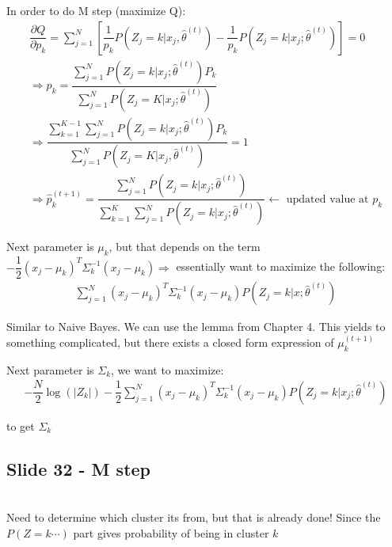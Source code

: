 \noindent In order to do M step (maximize Q):
\begin{equation*}
  \begin{gathered}
    \dfrac{\partial Q}{\partial p_k} = \sum_{j=1}^{N}\left[\dfrac{1}{p_k}P(Z_j=k|x_j,\widehat{\theta}^{(t)})-\dfrac{1}{p_k}P(Z_j=k|x_j;\widehat{\theta}^{(t)})\right] = 0\\
    \Rightarrow p_k = \dfrac{\sum_{j=1}^{N}P(Z_j=k|x_j;\widehat{\theta}^{(t)})P_k}{\sum_{j=1}^{N}P(Z_j=K|x_j;\widehat{\theta}^{(t)})}\\
    \Rightarrow \dfrac{\sum_{k=1}^{K-1}\sum_{j=1}^{N}P(Z_j=k|x_j;\widehat{\theta}^{(t)})P_k}{\sum_{j=1}^{N}P(Z_j=K|x_j,\widehat{\theta}^{(t)})} = 1\\
    \Rightarrow \widehat{p}_k^{(t+1)} = \dfrac{\sum_{j=1}^{N}P(Z_j=k|x_j;\widehat{\theta}^{(t)})}{\sum_{k=1}^{K}\sum_{j=1}^{N}P(Z_j=k|x_j;\widehat{\theta}^{(t)})}\leftarrow\text{ updated value at $p_k$}
  \end{gathered}
\end{equation*}
\par\bigskip
\noindent Next parameter is $\mu_k$, but that depends on the term $-\dfrac{1}{2}(x_j-\mu_k)^T\Sigma_k^{-1}(x_j-\mu_k)\Rightarrow$ essentially want to maximize the following:
\begin{equation*}
  \begin{gathered}
    \sum_{j=1}^{N}(x_j-\mu_k)^T\Sigma_k^{-1}(x_j-\mu_k)P(Z_j=k|x;\widehat{\theta}^{(t)})
  \end{gathered}
\end{equation*}\par
\noindent Similar to Naive Bayes. We can use the lemma from Chapter 4. This yields to something complicated, but there exists a closed form expression of $\mu_k^{(t+1)}$ 
\par\bigskip
\noindent Next parameter is $\Sigma_k$, we want to maximize:
\begin{equation*}
  \begin{gathered}
    -\dfrac{N}{2}\log(\left|Z_k\right|)-\dfrac{1}{2}\sum_{j=1}^{N}(x_j-\mu_k)^T\Sigma_k^{-1}(x_j-\mu_k)P(Z_j=k|x_j;\widehat{\theta}^{(t)})
  \end{gathered}
\end{equation*}\par
\noindent to get $\Sigma_k$
\par\bigskip
\subsection{Slide 32 - M step}\hfill\\
\noindent Need to determine which cluster its from, but that is already done! Since the $P(Z=k\cdots)$ part gives probability of being in cluster $k$
\par\bigskip
